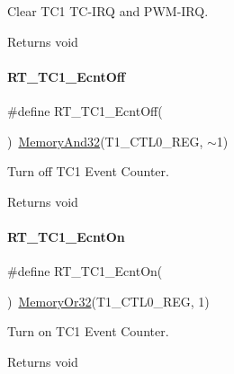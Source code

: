 Clear T\+C1 T\+C-\/\+I\+RQ and P\+W\+M-\/\+I\+RQ. 

\begin{DoxyReturn}{Returns}
void 
\end{DoxyReturn}
\mbox{\label{a00044_a1c9b9839a03d3e9b1158a2be2feebf42}} 
\paragraph{\texorpdfstring{R\+T\+\_\+\+T\+C1\+\_\+\+Ecnt\+Off}{RT\_TC1\_EcntOff}}
{\footnotesize\ttfamily \#define R\+T\+\_\+\+T\+C1\+\_\+\+Ecnt\+Off(\begin{DoxyParamCaption}{ }\end{DoxyParamCaption})~\mbox{\hyperlink{a00020_a5c1a2bd4c1bd4c2f429d8042a45327ff}{Memory\+And32}}(T1\+\_\+\+C\+T\+L0\+\_\+\+R\+EG, $\sim$1)}



Turn off T\+C1 Event Counter. 

\begin{DoxyReturn}{Returns}
void 
\end{DoxyReturn}
\mbox{\label{a00044_add9b6f778a744d79226f5165a04a38d9}} 
\paragraph{\texorpdfstring{R\+T\+\_\+\+T\+C1\+\_\+\+Ecnt\+On}{RT\_TC1\_EcntOn}}
{\footnotesize\ttfamily \#define R\+T\+\_\+\+T\+C1\+\_\+\+Ecnt\+On(\begin{DoxyParamCaption}{ }\end{DoxyParamCaption})~\mbox{\hyperlink{a00020_a9ea92ebccdef6bdaca4d00210cc7266d}{Memory\+Or32}}(T1\+\_\+\+C\+T\+L0\+\_\+\+R\+EG, 1)}



Turn on T\+C1 Event Counter. 

\begin{DoxyReturn}{Returns}
void 
\end{DoxyReturn}
\mbox{\label{a00044_a1c33903adfe470964d7eb5126c4ce7d4}} 
